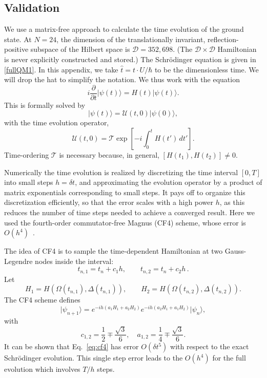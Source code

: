 \documentclass[a4paper,12pt]{article}
\theoremstyle{remark}
\theoremstyle{theorem}
\begin{document}
\subsection{Validation}\label{sec:validation}
We use a matrix-free approach to calculate the time evolution of the ground state.  At $N=24$, the dimension of the translationally invariant, reflection-positive subspace of the Hilbert space is $\mathcal{D}=352{,}698$. (The $\mathcal{D}\times \mathcal{D}$ Hamiltonian is never explicitly constructed and stored.) The Schr\"odinger equation is given in \eqref{fullQM1}. In this appendix, we take $\hat{t} =t\cdot U/\hbar$ to be the dimensionless time. We will drop the hat to simplify the notation. We thus work with the equation
\begin{equation}
i\frac{\partial}{\partial t}\lvert\psi(t)\rangle
=
H(t)\lvert\psi(t)\rangle .\label{eq:Schr11}
\end{equation}
This is formally solved by
\begin{equation}
\lvert\psi(t)\rangle
=
\mathcal{U}(t,0)\lvert\psi(0)\rangle ,
\end{equation}
with the time evolution operator,
\begin{equation}
\mathcal{U}(t,0)
=
\mathcal T
\exp\left[
-i\int_0^t H(t')\,dt'
\right].
\end{equation}
Time-ordering \(\mathcal T\) is necessary because, in general,
$
[H(t_1),H(t_2)]\neq 0.
$

Numerically the time evolution is realized by discretizing the time interval $[0,T]$ into small steps $h=\delta t$, and approximating the evolution operator by a product of matrix exponentials corresponding to small steps. It pays off to organize this discretization efficiently, so that the error scales with a high power $h$, as this reduces the number of time steps needed to achieve a converged result. Here we used the fourth-order commutator-free Magnus (CF4) scheme, whose error is $O(h^4)$~\cite{BlanesMoan2006,AlvermannFehske2011}.

The idea of CF4 is to sample the time-dependent Hamiltonian at two Gauss-Legendre nodes inside the interval:
\begin{equation}
t_{n,1}=t_n+c_1 h,\qquad t_{n,2}=t_n+c_2 h\,.
\end{equation}
Let
\begin{equation}
H_1=H\!\left(\Omega(t_{n,1}),\Delta(t_{n,1})\right),\qquad
H_2=H\!\left(\Omega(t_{n,2}),\Delta(t_{n,2})\right).
\end{equation}
The CF4 scheme defines
\begin{equation}\label{eq:cf4}
 \vert \psi_{n+1}\rangle=
 e^{-i h(a_1 H_1+a_2 H_2)}
 e^{-i h (a_2H_1+a_1H_2)} 
\vert \psi_n\rangle,
\end{equation}
with 
\begin{equation}
c_{1,2}=\frac12\mp\frac{\sqrt3}{6}, \quad
a_{1,2}=\frac14\mp\frac{\sqrt3}{6}.
\end{equation}
It can be shown that Eq.~\eqref{eq:cf4} has error $O(\delta t^5)$ with respect to the exact Schr\"odinger evolution. This single step error leads to the $O(h^4)$ for the full evolution which involves $T/h$ steps.
\end{document}
